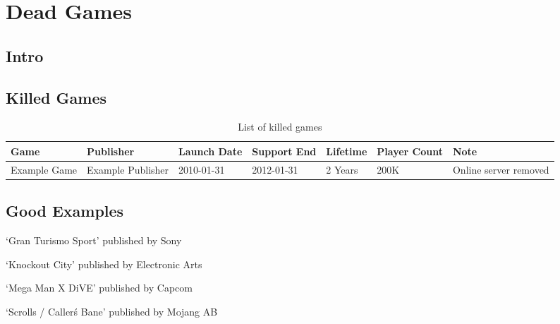 \chapter{Dead Games}

\section{Intro}


\section{Killed Games}



\begin{landscape}
\begin{table}[htbp]
    \centering
    \caption{List of killed games}%
    \label{tab:killedgames}
    \begin{tabular*}{1\textwidth}{lllllll}
        Game & Publisher & Launch Date & Support End & Lifetime & Player Count & Note \\ \toprule
        Example Game & Example Publisher & 2010-01-31 & 2012-01-31 & 2 Years & 200K & Online server removed \\
    \end{tabular*}
\end{table}
\end{landscape}

\section{Good Examples}

`Gran Turismo Sport' published by Sony

`Knockout City' published by Electronic Arts

`Mega Man X DiVE' published by Capcom

`Scrolls / Caller\'s Bane' published by Mojang AB

